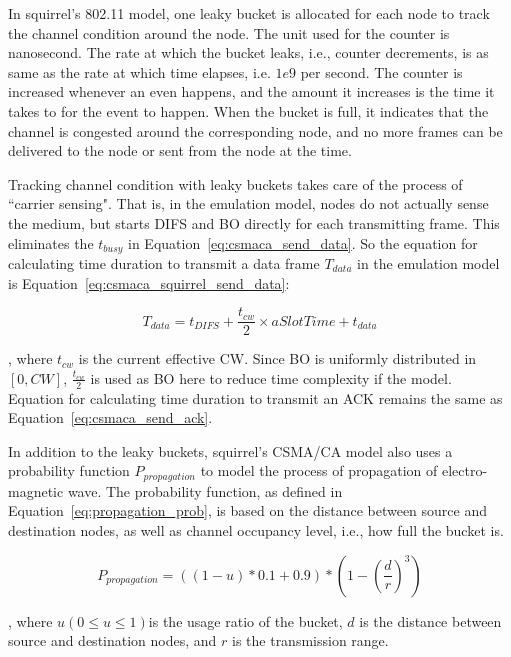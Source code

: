 \documentclass[12pt]{report}
\begin{document}
In squirrel's 802.11 model, one leaky bucket is allocated for each node to track the channel condition around the node. The unit used for the counter is nanosecond. The rate at which the bucket leaks, i.e., counter decrements, is as same as the rate at which time elapses, i.e. $1e9$ per second. The counter is increased whenever an even happens, and the amount it increases is the time it takes to for the event to happen. When the bucket is full, it indicates that the channel is congested around the corresponding node, and no more frames can be delivered to the node or sent from the node at the time.

Tracking channel condition with leaky buckets takes care of the process of ``carrier sensing". That is, in the emulation model, nodes do not actually sense the medium, but starts DIFS and BO directly for each transmitting frame. This eliminates the $t_{busy}$ in Equation~\ref{eq:csmaca_send_data}. So the equation for calculating time duration to transmit a data frame $T_{data}$ in the emulation model is Equation~\ref{eq:csmaca_squirrel_send_data}:

\begin{equation}
  T_{data}=t_{DIFS}+\frac{t_{cw}}{2}\times aSlotTime+t_{data}
  \label{eq:csmaca_squirrel_send_data}
\end{equation}

, where $t_{cw}$ is the current effective CW. Since BO is uniformly distributed in $[0,CW]$, $\frac{t_{cw}}{2}$ is used as BO here to reduce time complexity if the model. Equation for calculating time duration to transmit an ACK remains the same as Equation~\ref{eq:csmaca_send_ack}.

In addition to the leaky buckets, squirrel's CSMA/CA model also uses a probability function $P_{propagation}$ to model the process of propagation of electro-magnetic wave. The probability function, as defined in Equation~\ref{eq:propagation_prob}, is based on the distance between source and destination nodes, as well as channel occupancy level, i.e., how full the bucket is.

\begin{equation}
  P_{propagation}=((1-u) * 0.1 + 0.9) * (1-(\frac{d}{r})^3)
  \label{eq:propagation_prob}
\end{equation}

, where $u(0\le u\le 1)$is the usage ratio of the bucket, $d$ is the distance between source and destination nodes, and $r$ is the transmission range.
\end{document}
